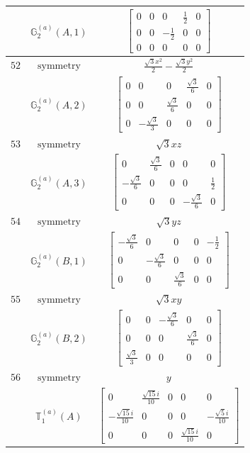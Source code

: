 \documentclass[fleqn,8pt,landscape]{jsarticle}
\begin{document}
\begin{longtable}{ccc}
$  $ & $ \mathbb{G}_{2}^{(a)}(A,1) $ & $ \begin{bmatrix} 0 & 0 & 0 & \frac{1}{2} & 0 \\ 0 & 0 & - \frac{1}{2} & 0 & 0 \\ 0 & 0 & 0 & 0 & 0 \end{bmatrix} $ \\ \hline
$ 52 $ & $ \text{symmetry} $ & $ \frac{\sqrt{3} x^{2}}{2} - \frac{\sqrt{3} y^{2}}{2} $ \\
$  $ & $ \mathbb{G}_{2}^{(a)}(A,2) $ & $ \begin{bmatrix} 0 & 0 & 0 & \frac{\sqrt{3}}{6} & 0 \\ 0 & 0 & \frac{\sqrt{3}}{6} & 0 & 0 \\ 0 & - \frac{\sqrt{3}}{3} & 0 & 0 & 0 \end{bmatrix} $ \\ \hline
$ 53 $ & $ \text{symmetry} $ & $ \sqrt{3} x z $ \\
$  $ & $ \mathbb{G}_{2}^{(a)}(A,3) $ & $ \begin{bmatrix} 0 & \frac{\sqrt{3}}{6} & 0 & 0 & 0 \\ - \frac{\sqrt{3}}{6} & 0 & 0 & 0 & \frac{1}{2} \\ 0 & 0 & 0 & - \frac{\sqrt{3}}{6} & 0 \end{bmatrix} $ \\ \hline
$ 54 $ & $ \text{symmetry} $ & $ \sqrt{3} y z $ \\
$  $ & $ \mathbb{G}_{2}^{(a)}(B,1) $ & $ \begin{bmatrix} - \frac{\sqrt{3}}{6} & 0 & 0 & 0 & - \frac{1}{2} \\ 0 & - \frac{\sqrt{3}}{6} & 0 & 0 & 0 \\ 0 & 0 & \frac{\sqrt{3}}{6} & 0 & 0 \end{bmatrix} $ \\ \hline
$ 55 $ & $ \text{symmetry} $ & $ \sqrt{3} x y $ \\
$  $ & $ \mathbb{G}_{2}^{(a)}(B,2) $ & $ \begin{bmatrix} 0 & 0 & - \frac{\sqrt{3}}{6} & 0 & 0 \\ 0 & 0 & 0 & \frac{\sqrt{3}}{6} & 0 \\ \frac{\sqrt{3}}{3} & 0 & 0 & 0 & 0 \end{bmatrix} $ \\ \hline
$ 56 $ & $ \text{symmetry} $ & $ y $ \\
$  $ & $ \mathbb{T}_{1}^{(a)}(A) $ & $ \begin{bmatrix} 0 & \frac{\sqrt{15} i}{10} & 0 & 0 & 0 \\ - \frac{\sqrt{15} i}{10} & 0 & 0 & 0 & - \frac{\sqrt{5} i}{10} \\ 0 & 0 & 0 & \frac{\sqrt{15} i}{10} & 0 \end{bmatrix} $ \\ \hline

\end{longtable}
\end{document}
